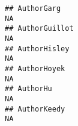 \documentclass[]{article}
\begin{document}
\begin{verbatim}
## AuthorGarg                                                                                                                                                                                                                                                                                                                                                                                                                                                                           NA
## AuthorGuillot                                                                                                                                                                                                                                                                                                                                                                                                                                                                        NA
## AuthorHisley                                                                                                                                                                                                                                                                                                                                                                                                                                                                         NA
## AuthorHoyek                                                                                                                                                                                                                                                                                                                                                                                                                                                                          NA
## AuthorHu                                                                                                                                                                                                                                                                                                                                                                                                                                                                             NA
## AuthorKeedy                                                                                                                                                                                                                                                                                                                                                                                                                                                                          NA

\end{verbatim}
\end{document}
